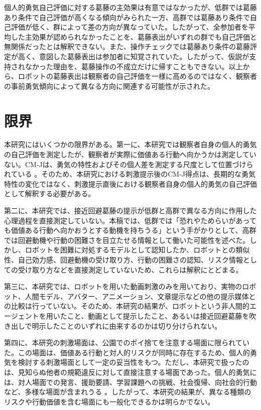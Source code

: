 \documentclass[utf8]{FrontiersinHarvard}
\begin{document}
個人的勇気自己評価に対する葛藤の主効果は有意ではなかったが、低群では葛藤あり条件で自己評価が高くなる傾向がみられた一方、高群では葛藤あり条件で自己評価が低く、群によって差の方向が異なっていた。したがって、全参加者を平均した主効果が認められなかったことを、葛藤表出がいずれの群でも自己評価と無関係だったとは解釈できない。また、操作チェックでは葛藤あり条件の葛藤評定が高く、意図した葛藤表出は参加者に知覚されていた。したがって、仮説が支持されなかった理由を、葛藤操作の不成立だけに帰すこともできない。以上から、ロボットの葛藤表出は観察者の自己評価を一様に高めるのではなく、観察者の事前勇気傾向によって異なる方向に関連する可能性が示された。

\section{限界}

本研究にはいくつかの限界がある。第一に、本研究では観察者自身の個人的勇気の自己評価を測定したが、観察者が実際に価値ある行動へ向かうかは測定していない。CM-Jは、勇気の特性およびその個人差を測定する尺度として位置づけられている \citep{shimotsukasa2023}。そのため、本研究における刺激提示後のCM-J得点は、長期的な勇気特性の変化ではなく、刺激提示直後における観察者自身の個人的勇気の自己評価として解釈する必要がある。

第二に、本研究では、接近回避葛藤の提示が低群と高群で異なる方向に作用した心理過程を直接測定していない。本稿では、低群では「恐れやためらいがあっても価値ある行動へ向かおうとする動機を持ちうる」という手がかりとして、高群では回避動機や行動の困難さを目立たせる情報として働いた可能性を述べた。しかし、ロボットを困難に対処するモデルとして認知したか、ロボットとの類似性、自己効力感、回避動機の受け取り方、行動の困難さの認知、リスク情報としての受け取り方などを直接測定していないため、これらは解釈にとどまる。

第三に、本研究では、ロボットを用いた動画刺激のみを用いており、実物のロボット、人間モデル、アバター、アニメーション、文章提示などの他の提示媒体との比較は行っていない。そのため、本研究の結果が、ロボットという非人間的エージェントを用いたこと、動画として提示したこと、あるいは接近回避葛藤を吹き出しで明示したことのいずれに由来するのかは切り分けられない。

第四に、本研究の刺激場面は、公園でのポイ捨てを注意する場面に限られていた。この場面は、価値ある行動と対人的リスクが同時に存在するため、個人的勇気を検討する刺激場面として一定の妥当性をもつ。ただし、本研究で扱ったのは、見知らぬ他者の規範違反に対して直接注意する場面であった。個人的勇気には、対人場面での発言、援助要請、学習課題への挑戦、社会復帰、向社会的行動など、多様な場面が含まれうる \citep{pury2007,howard2017,vogel2007}。したがって、本研究の結果が、異なる種類のリスクや行動価値を含む場面にも一般化できるかは明らかでない。
\end{document}
